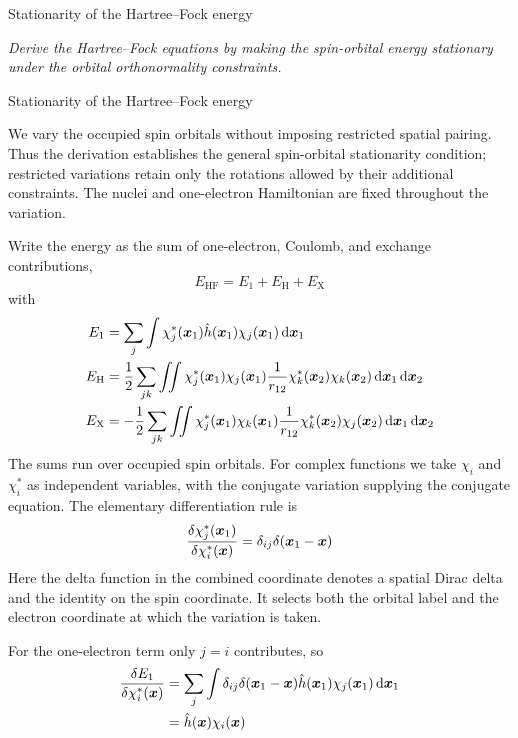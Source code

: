 \documentclass[11pt,a4paper,titlepage]{article}
\numberwithin{equation}{section}
\newcommand{\bx}{\boldsymbol{x}}
\newcommand{\hh}{\Hat{h}}
\newcommand{\violet}[1]{\textcolor{hfViolet}{#1}}
\begin{document}
\begin{hfexercise}[phantom={\label{ex:hf-orbital-stationarity}}]{Stationarity of the Hartree--Fock energy}

\violet{\textit{Derive the Hartree--Fock equations by making the spin-orbital
energy stationary under the orbital orthonormality constraints.}}

\end{hfexercise}
\begin{hfsolution}{Stationarity of the Hartree--Fock energy}

We vary the occupied spin orbitals without imposing restricted spatial
pairing. Thus the derivation establishes the general spin-orbital
stationarity condition; restricted variations retain only the rotations
allowed by their additional constraints. The nuclei and one-electron
Hamiltonian are fixed throughout the variation.

Write the energy as the sum of one-electron, Coulomb, and exchange
contributions,
\begin{equation}
  E_\text{HF}=E_1+E_\text{H}+E_\text{X}
\end{equation}
with
\begin{align}
  E_1&=\sum_j\int\chi_j^*(\bx_1)\hh(\bx_1)
    \chi_j(\bx_1)\dd{\bx_1}
  \\
  E_\text{H}&=\frac12\sum_{jk}\iint
    \chi_j^*(\bx_1)\chi_j(\bx_1)\frac{1}{r_{12}}
    \chi_k^*(\bx_2)\chi_k(\bx_2)\dd{\bx_1}\dd{\bx_2}
  \\
  E_\text{X}&=-\frac12\sum_{jk}\iint
    \chi_j^*(\bx_1)\chi_k(\bx_1)\frac{1}{r_{12}}
    \chi_k^*(\bx_2)\chi_j(\bx_2)\dd{\bx_1}\dd{\bx_2}
\end{align}
The sums run over occupied spin orbitals. For complex functions we take
$\chi_i$ and $\chi_i^*$ as independent variables, with the conjugate
variation supplying the conjugate equation. The elementary differentiation
rule is
\begin{equation}
  \fdv{\chi_j^*(\bx_1)}{\chi_i^*(\bx)}
  =\delta_{ij}\delta(\bx_1-\bx)
\end{equation}
Here the delta function in the combined coordinate denotes a spatial Dirac
delta and the identity on the spin coordinate. It selects both the orbital
label and the electron coordinate at which the variation is taken.

For the one-electron term only $j=i$ contributes, so
\begin{equation}
\begin{split}
  \fdv{E_1}{\chi_i^*(\bx)}
  &=\sum_j\int\delta_{ij}\delta(\bx_1-\bx)
    \hh(\bx_1)\chi_j(\bx_1)\dd{\bx_1}
  \\
  &=\hh(\bx)\chi_i(\bx)
\end{split}
\end{equation}


\end{hfsolution}
\end{document}
